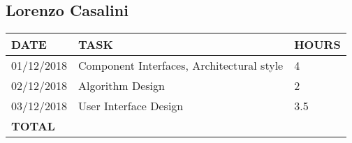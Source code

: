 \documentclass[12pt]{article}
\begin{document}
\subsection{Lorenzo Casalini}

\begin{center}
\begin{tabular}{ |p{}|p{}|p{}| } 
 \hline
 \textbf{DATE} & \textbf{TASK} & \textbf{HOURS} \\ 
  \hline
 01/12/2018 & Component Interfaces, Architectural style & 4\\
 \hline 
 02/12/2018 & Algorithm Design & 2 \\
 \hline
 03/12/2018 & User Interface Design & 3.5\\ 
  
  \hline
  \textbf{TOTAL} & \multicolumn{2}{c|}{} \\ 
  \hline
\end{tabular}
\end{center}
\end{document}
